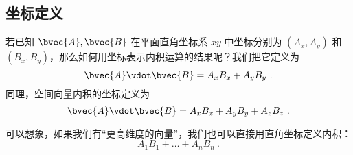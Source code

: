 \subsection{坐标定义}
若已知 $\bvec{A}, \bvec{B}$ 在平面直角坐标系 $xy$ 中坐标分别为 $(A_x, A_y)$ 和  $(B_x, B_y)$，那么如何用坐标表示内积运算的结果呢？我们把它定义为
\begin{equation}\label{eq_Dot_5}
\bvec{A} \vdot \bvec{B} = A_x B_x + A_y B_y~.
\end{equation}
同理，空间向量内积的坐标定义为
\begin{equation}\label{eq_Dot_4}
\bvec{A} \vdot \bvec{B} = A_x B_x + A_y B_y + A_z B_z	~.
\end{equation}

可以想象，如果我们有“更高维度的向量”，我们也可以直接用直角坐标定义内积：
\begin{equation}
A_1 B_1 + \dots + A_n B_n ~.
\end{equation}



